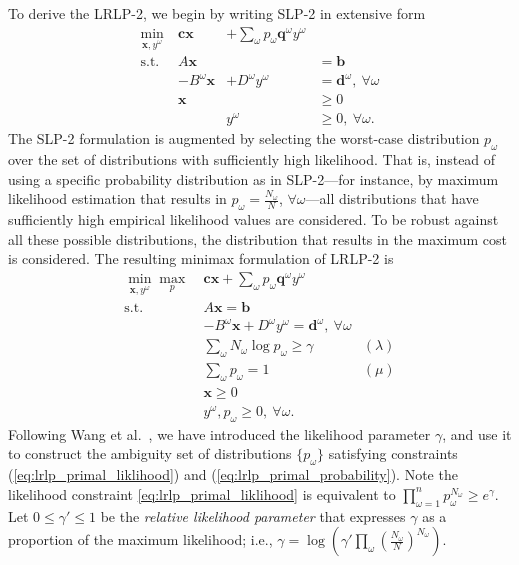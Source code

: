 \documentclass{iserc}
\newcommand{\x}{\mathbf{x}}
\renewcommand{\c}{\mathbf{c}}
\newcommand{\q}{\mathbf{q}}
\renewcommand{\b}{\mathbf{b}}
\renewcommand{\d}{\mathbf{d}}
\newcommand{\st}{\mbox{s.t.}}
\begin{document}
To derive the LRLP-2, we begin by writing SLP-2 in extensive form
\[
	\begin{array}{rrrl}
		\min_{\x,y^\omega} \ & \c\x & + \sum_\omega p_\omega \q^\omega y^\omega \label{eq:slp2cost} \\
		\st \ & A\x & & = \b \nonumber \\
		& -B^\omega \x & + D^\omega y^\omega & = \d^\omega,\ \forall \omega \nonumber \\
		& \x & & \geq 0 \nonumber \\
		& & y^\omega & \geq 0,\ \forall \omega. \nonumber
	\end{array}
\]
The SLP-2 formulation is augmented by selecting the worst-case distribution $p_\omega$ over the set of distributions with sufficiently high likelihood.
That is, instead of using a specific probability distribution as in SLP-2---for instance, by maximum likelihood estimation that results in $p_\omega = \frac{N_\omega}{N}$, $\forall \omega$---all distributions that have sufficiently high empirical likelihood values are considered.
To be robust against all these possible distributions, the distribution that results in the maximum cost is considered.
The resulting minimax formulation of LRLP-2 is
\begin{align}
	\min_{\x,y^\omega} \max_p \ & \c\x + \sum_\omega p_\omega \q^\omega y^\omega \label{eq:lrlp_primal}\\
	\st \ & A\x = \b \nonumber \\
	& -B^\omega \x + D^\omega y^\omega = \d^\omega,\ \forall \omega \nonumber \\
	& \sum_\omega N_\omega \log p_\omega \geq \gamma & (\lambda) \label{eq:lrlp_primal_liklihood} \\
	& \sum_\omega p_\omega = 1 & (\mu) \label{eq:lrlp_primal_probability} \\
	& \x \geq 0 \nonumber \\
	& y^\omega, p_\omega \geq 0,\ \forall \omega. \nonumber
\end{align}
Following Wang et al.\ \cite{wang2010likelihood}, we have introduced the likelihood parameter $\gamma$, and use it to construct the ambiguity set of distributions $\{p_\omega\}$ satisfying constraints (\ref{eq:lrlp_primal_liklihood}) and (\ref{eq:lrlp_primal_probability}).
Note the likelihood constraint \eqref{eq:lrlp_primal_liklihood} is equivalent to $\prod_{\omega=1}^n p_\omega^{N_\omega} \geq e^\gamma$.
Let $0 \leq \gamma' \leq 1$ be the \emph{relative likelihood parameter} that expresses $\gamma$ as a proportion of the maximum likelihood; i.e., $\gamma = \log( \gamma' \prod_\omega (\tfrac{N_\omega}{N})^{N_\omega})$.
\end{document}
